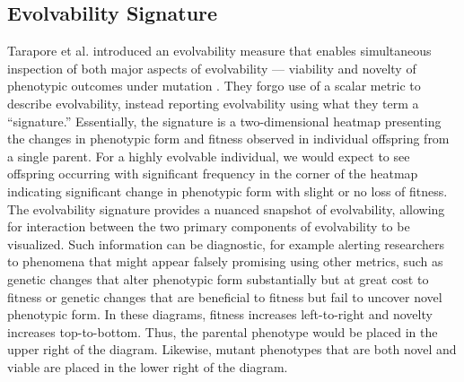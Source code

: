 \subsection{Evolvability Signature}
Tarapore et al. introduced an evolvability measure that enables simultaneous inspection of both major aspects of evolvability --- viability and novelty of phenotypic outcomes under mutation \cite{tarapore2015evolvability}.
They forgo use of a scalar metric to describe evolvability, instead reporting evolvability using what they term a ``signature.''
Essentially, the signature is a two-dimensional heatmap presenting the changes in phenotypic form and fitness observed in individual offspring from a single parent.
For a highly evolvable individual, we would expect to see offspring occurring with significant frequency in the corner of the heatmap indicating significant change in phenotypic form with slight or no loss of fitness.
The evolvability signature provides a nuanced snapshot of evolvability, allowing for interaction between the two primary components of evolvability to be visualized.
Such information can be diagnostic, for example alerting researchers to phenomena that might appear falsely promising using other metrics, such as genetic changes that alter phenotypic form substantially but at great cost to fitness or genetic changes that are beneficial to fitness but fail to uncover novel phenotypic form.
In these diagrams, fitness increases left-to-right and novelty increases top-to-bottom.
Thus, the parental phenotype would be placed in the upper right of the diagram.
Likewise, mutant phenotypes that are both novel and viable are placed in the lower right of the diagram.
